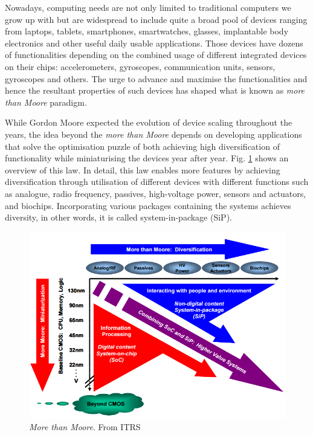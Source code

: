 Nowadays, computing needs are not only limited to traditional computers we grow up with but are widespread to include quite a broad pool of devices ranging from laptops, tablets, smartphones, smartwatches, glasses, implantable body electronics and other useful daily usable applications. Those devices have dozens of functionalities depending on the combined usage of different integrated devices on their chips: accelerometers, gyroscopes, communication units, sensors, gyroscopes and others. The urge to advance and maximise the functionalities and hence the resultant properties of such devices has shaped what is known as \textit{more than Moore} paradigm. 

While Gordon Moore expected the evolution of device scaling throughout the years, the idea beyond the \textit{more than Moore} depends on developing applications that solve the optimisation puzzle of both achieving high diversification of functionality while miniaturising the devices year after year. Fig. \ref{fig:moore} shows an overview of this law. In detail, this law enables more features by achieving diversification through utilisation of different devices with different functions such as analogue, radio frequency, passives, high-voltage power, sensors and actuators, and biochips. Incorporating various packages containing the systems achieves diversity, in other words, it is called system-in-package (SiP). 

\begin{figure}
    \centering
    \includegraphics[width=\textwidth]{Figs/MoreThanMoore.png}
    \caption{\textit{More than Moore}. From ITRS~\cite{Arden2010}}
    \label{fig:moore}
\end{figure}

